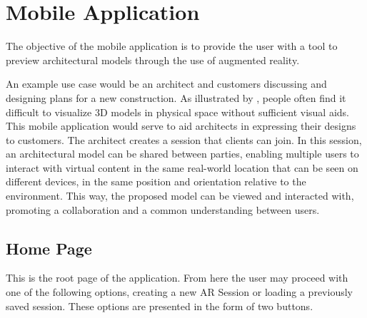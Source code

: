 \section{Mobile Application}

The objective of the mobile application is to provide the user with a tool to preview architectural models through the use of augmented reality. 

An example use case would be an architect and customers discussing and designing plans for a new construction. As illustrated by \cite{lorensen1987marching}, people often find it difficult to visualize 3D models in physical space without sufficient visual aids. This mobile application would serve to aid architects in expressing their designs to customers. The architect creates a session that clients can join. In this session, an architectural model can be shared between parties, enabling multiple users to interact with virtual content in the same real-world location that can be seen on different devices, in the same position and orientation relative to the environment. This way, the proposed model can be viewed and interacted with, promoting a collaboration and a common understanding between users. 


\subsection{Home Page}

This is the root page of the application. From here the user may proceed with one of the following options, creating a new AR Session or loading a previously saved session. These options are presented in the form of two buttons.

